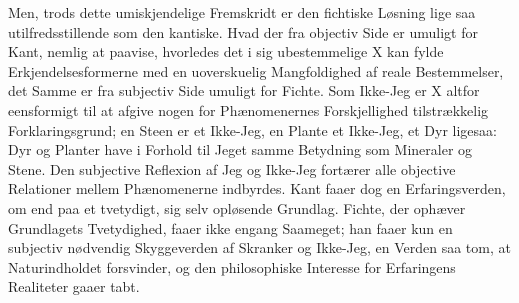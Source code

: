 \documentclass[12pt]{article}
\begin{document}
Men, trods dette umiskjendelige Fremskridt er den
fichtiske Løsning lige saa utilfredsstillende som den kantiske.
Hvad der fra objectiv Side er umuligt for Kant, nemlig at
paavise, hvorledes det i sig ubestemmelige X kan fylde
Erkjendelsesformerne med en uoverskuelig Mangfoldighed af reale
Bestemmelser, det Samme er fra subjectiv Side umuligt for
Fichte. Som Ikke-Jeg er X altfor eensformigt til at afgive
nogen for Phænomenernes Forskjellighed tilstrækkelig
Forklaringsgrund; en Steen er et Ikke-Jeg, en Plante et Ikke-Jeg, et
Dyr ligesaa: Dyr og Planter have i Forhold til Jeget samme
Betydning som Mineraler og Stene. Den subjective Reflexion
af Jeg og Ikke-Jeg fortærer alle objective Relationer mellem
Phænomenerne indbyrdes. Kant faaer dog en Erfaringsverden,
om end paa et tvetydigt, sig selv opløsende Grundlag. Fichte,
der ophæver Grundlagets Tvetydighed, faaer ikke engang
Saameget; han faaer kun en subjectiv nødvendig Skyggeverden af
Skranker og Ikke-Jeg, en Verden saa tom, at Naturindholdet
forsvinder, og den philosophiske Interesse for Erfaringens
Realiteter gaaer tabt.
\end{document}
